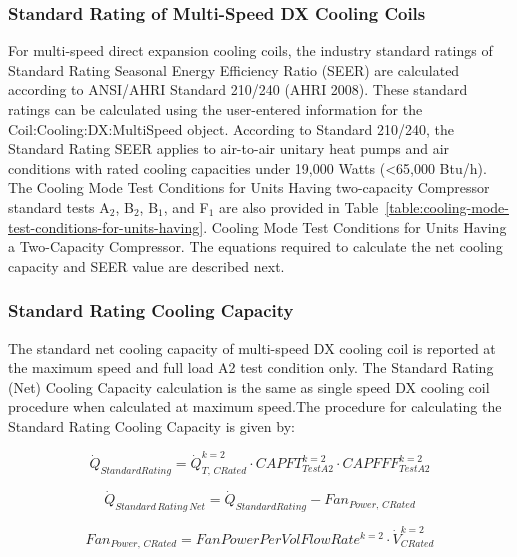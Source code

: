 \subsubsection{Standard Rating of Multi-Speed DX Cooling Coils}\label{standard-rating-of-multi-speed-dx-cooling-coils}

For multi-speed direct expansion cooling coils, the industry standard ratings of Standard Rating Seasonal Energy Efficiency Ratio (SEER) are calculated according to ANSI/AHRI Standard 210/240 (AHRI 2008). These standard ratings can be calculated using the user-entered information for the Coil:Cooling:DX:MultiSpeed object. According to Standard 210/240, the Standard Rating SEER applies to air-to-air unitary heat pumps and air conditions with rated cooling capacities under 19,000 Watts (\textless{}65,000 Btu/h). The Cooling Mode Test Conditions for Units Having two-capacity Compressor standard tests A\(_{2}\), B\(_{2}\), B\(_{1}\), and F\(_{1}\) are also provided in Table~\ref{table:cooling-mode-test-conditions-for-units-having}. Cooling Mode Test Conditions for Units Having a Two-Capacity Compressor. The equations required to calculate the net cooling capacity and SEER value are described next.

\subsubsection{Standard Rating Cooling Capacity}\label{standard-rating-cooling-capacity}

The standard net cooling capacity of multi-speed DX cooling coil is reported at the maximum speed and full load A2 test condition only. The Standard Rating (Net) Cooling Capacity calculation is the same as single speed DX cooling coil procedure when calculated at maximum speed.The procedure for calculating the Standard Rating Cooling Capacity is given by:

\begin{equation}
{\dot Q_{StandardRating}} = \dot Q_{T,\,CRated}^{k = 2} \cdot CAPFT_{TestA2}^{k = 2} \cdot CAPFFF_{TestA2}^{k = 2}
\end{equation}

\begin{equation}
{\dot Q_{Standard\,Rating\,Net}} = {\dot Q_{StandardRating}} - Fa{n_{Power,\,CRated}}
\end{equation}

\begin{equation}
Fa{n_{Power,\,CRated}} = FanPowerPerVolFlowRat{e^{k = 2}} \cdot \dot V_{CRated}^{k = 2}
\end{equation}

